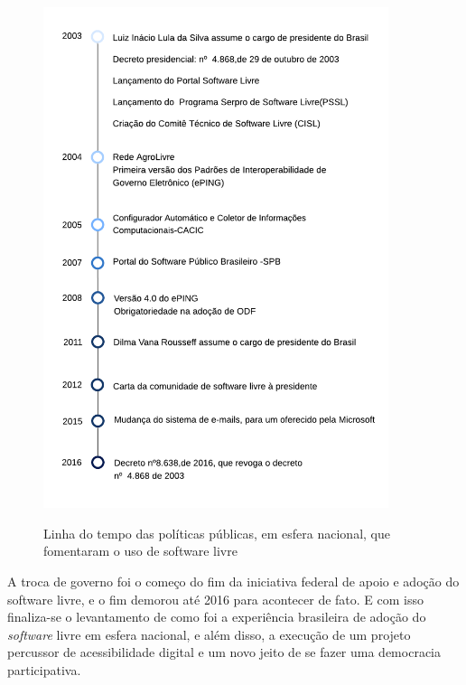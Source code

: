 \documentclass[12pt]{article}
\begin{document}
\begin{figure}[H]
  \begin{center}
    \caption{Linha do tempo das políticas públicas, em esfera nacional, que fomentaram o uso de software livre}
    \includegraphics[width=0.9\textwidth,height=\textheight,keepaspectratio]{images/Linha do tempo de um projeto.png}
    \label{fig: label-imagem}

  \end{center}
\end{figure}




A troca de governo foi o começo do fim da iniciativa federal de apoio e adoção do software livre, e o fim demorou até 2016 para acontecer de fato. E com isso finaliza-se o levantamento de como foi a experiência brasileira de adoção do \textit{software} livre em esfera nacional, e além disso, a execução de um projeto percussor de acessibilidade digital e um novo jeito de se fazer uma democracia participativa.
\end{document}
